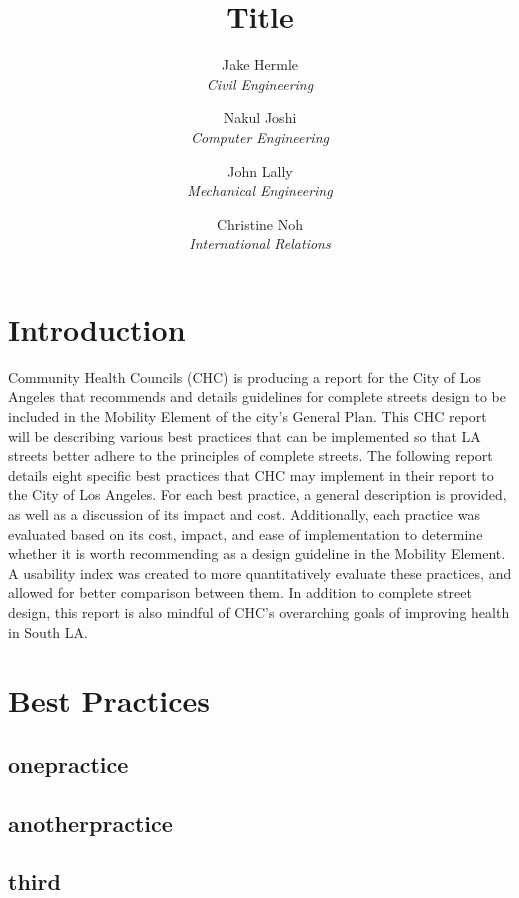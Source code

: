 \documentclass[titlepage]{article}
\title{Title}
\author{
	Jake Hermle\\ \emph{Civil Engineering} \and
	Nakul Joshi\\ \emph{Computer Engineering} \and
	John Lally\\ \emph{Mechanical Engineering}\and
	Christine Noh\\ \emph{International Relations}
}
\begin{document}
\maketitle

\begin{abstract}

\end{abstract}

\tableofcontents
\newpage
\listoffigures
\newpage
\listoftables
\newpage



\section{Introduction}

Community Health Councils (CHC) is producing a report for the City of Los Angeles that recommends and details guidelines for complete streets design to be included in the Mobility Element of the city’s General Plan. This CHC report will be describing various best practices that can be implemented so that LA streets better adhere to the principles of complete streets. The following report details eight specific best practices that CHC may implement in their report to the City of Los Angeles. For each best practice, a general description is provided, as well as a discussion of its impact and cost. Additionally, each practice was evaluated based on its cost, impact, and ease of implementation to determine whether it is worth recommending as a design guideline in the Mobility Element. A usability index was created to more quantitatively evaluate these practices, and allowed for better comparison between them. In addition to complete street design, this report is also mindful of CHC’s overarching goals of improving health in South LA.

\section{Best Practices}
	\subsection{onepractice}
	\subsection{anotherpractice}
	\subsection{third}
\end{document}

